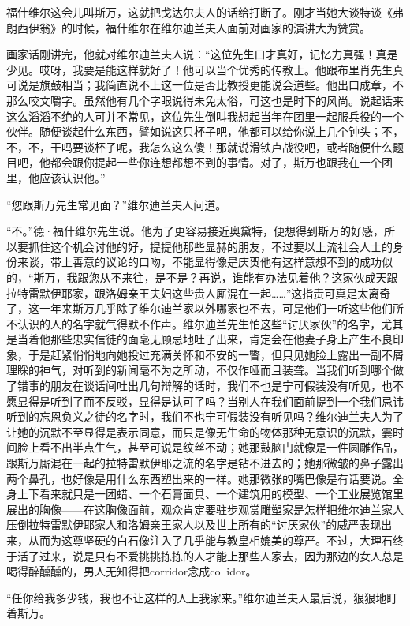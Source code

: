 \par 福什维尔这会儿叫斯万，这就把戈达尔夫人的话给打断了。刚才当她大谈特谈《弗朗西伊翁》的时候，福什维尔在维尔迪兰夫人面前对画家的演讲大为赞赏。
\par 画家话刚讲完，他就对维尔迪兰夫人说：“这位先生口才真好，记忆力真强！真是少见。哎呀，我要是能这样就好了！他可以当个优秀的传教士。他跟布里肖先生真可说是旗鼓相当；我简直说不上这一位是否比教授更能说会道些。他出口成章，不那么咬文嚼字。虽然他有几个字眼说得未免太俗，可这也是时下的风尚。说起话来这么滔滔不绝的人可并不常见，这位先生倒叫我想起当年在团里一起服兵役的一个伙伴。随便谈起什么东西，譬如说这只杯子吧，他都可以给你说上几个钟头；不，不，不，干吗要谈杯子呢，我怎么这么傻！那就说滑铁卢战役吧，或者随便什么题目吧，他都会跟你提起一些你连想都想不到的事情。对了，斯万也跟我在一个团里，他应该认识他。”
\par “您跟斯万先生常见面？”维尔迪兰夫人问道。
\par “不。”德·福什维尔先生说。他为了更容易接近奥黛特，便想得到斯万的好感，所以要抓住这个机会讨他的好，提提他那些显赫的朋友，不过要以上流社会人士的身份来谈，带上善意的议论的口吻，不能显得像是庆贺他有这样意想不到的成功似的，“斯万，我跟您从不来往，是不是？再说，谁能有办法见着他？这家伙成天跟拉特雷默伊耶家，跟洛姆亲王夫妇这些贵人厮混在一起……”这指责可真是太离奇了，这一年来斯万几乎除了维尔迪兰家以外哪家也不去，可是他们一听这些他们所不认识的人的名字就气得默不作声。维尔迪兰先生怕这些“讨厌家伙”的名字，尤其是当着他那些忠实信徒的面毫无顾忌地吐了出来，肯定会在他妻子身上产生不良印象，于是赶紧悄悄地向她投过充满关怀和不安的一瞥，但只见她脸上露出一副不屑理睬的神气，对听到的新闻毫不为之所动，不仅作哑而且装聋。当我们听到哪个做了错事的朋友在谈话间吐出几句辩解的话时，我们不也是宁可假装没有听见，也不愿显得是听到了而不反驳，显得是认可了吗？当别人在我们面前提到一个我们忌讳听到的忘恩负义之徒的名字时，我们不也宁可假装没有听见吗？维尔迪兰夫人为了让她的沉默不至显得是表示同意，而只是像无生命的物体那种无意识的沉默，霎时间脸上看不出半点生气，甚至可说是纹丝不动；她那鼓脑门就像是一件圆雕作品，跟斯万厮混在一起的拉特雷默伊耶之流的名字是钻不进去的；她那微皱的鼻子露出两个鼻孔，也好像是用什么东西塑出来的一样。她那微张的嘴巴像是有话要说。全身上下看来就只是一团蜡、一个石膏面具、一个建筑用的模型、一个工业展览馆里展出的胸像——在这胸像面前，观众肯定要驻步观赏雕塑家是怎样把维尔迪兰家人压倒拉特雷默伊耶家人和洛姆亲王家人以及世上所有的“讨厌家伙”的威严表现出来，从而为这尊坚硬的白石像注入了几乎能与教皇相媲美的尊严。不过，大理石终于活了过来，说是只有不爱挑挑拣拣的人才能上那些人家去，因为那边的女人总是喝得醉醺醺的，男人无知得把corridor念成collidor。
\par “任你给我多少钱，我也不让这样的人上我家来。”维尔迪兰夫人最后说，狠狠地盯着斯万。
